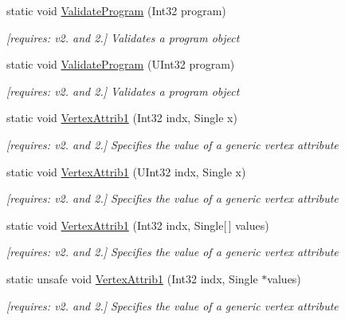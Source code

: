 \begin{DoxyCompactItemize}
static void \hyperlink{class_open_t_k_1_1_graphics_1_1_e_s20_1_1_g_l_a91c5e1222d2523224674c611bb318dd3}{Validate\-Program} (Int32 program)
\begin{DoxyCompactList}\small\item\em \mbox{[}requires\-: v2. and 2.\mbox{]} Validates a program object \end{DoxyCompactList}\item 
static void \hyperlink{class_open_t_k_1_1_graphics_1_1_e_s20_1_1_g_l_a9276a1136a973f66b9e5d01483a60387}{Validate\-Program} (U\-Int32 program)
\begin{DoxyCompactList}\small\item\em \mbox{[}requires\-: v2. and 2.\mbox{]} Validates a program object \end{DoxyCompactList}\item 
static void \hyperlink{class_open_t_k_1_1_graphics_1_1_e_s20_1_1_g_l_a5d7c80c2da1558caed6c52edf93cb2c1}{Vertex\-Attrib1} (Int32 indx, Single x)
\begin{DoxyCompactList}\small\item\em \mbox{[}requires\-: v2. and 2.\mbox{]} Specifies the value of a generic vertex attribute \end{DoxyCompactList}\item 
static void \hyperlink{class_open_t_k_1_1_graphics_1_1_e_s20_1_1_g_l_ad620a684f173d3f2dacadcb050d43409}{Vertex\-Attrib1} (U\-Int32 indx, Single x)
\begin{DoxyCompactList}\small\item\em \mbox{[}requires\-: v2. and 2.\mbox{]} Specifies the value of a generic vertex attribute \end{DoxyCompactList}\item 
static void \hyperlink{class_open_t_k_1_1_graphics_1_1_e_s20_1_1_g_l_a41fd0c859aea7f5a839158f24457a7ba}{Vertex\-Attrib1} (Int32 indx, Single\mbox{[}$\,$\mbox{]} values)
\begin{DoxyCompactList}\small\item\em \mbox{[}requires\-: v2. and 2.\mbox{]} Specifies the value of a generic vertex attribute \end{DoxyCompactList}\item 
static unsafe void \hyperlink{class_open_t_k_1_1_graphics_1_1_e_s20_1_1_g_l_aa5fff400fa9ab57636b874fc4e1ccb3c}{Vertex\-Attrib1} (Int32 indx, Single $\ast$values)
\begin{DoxyCompactList}\small\item\em \mbox{[}requires\-: v2. and 2.\mbox{]} Specifies the value of a generic vertex attribute \end{DoxyCompactList}\item 

\end{DoxyCompactItemize}
